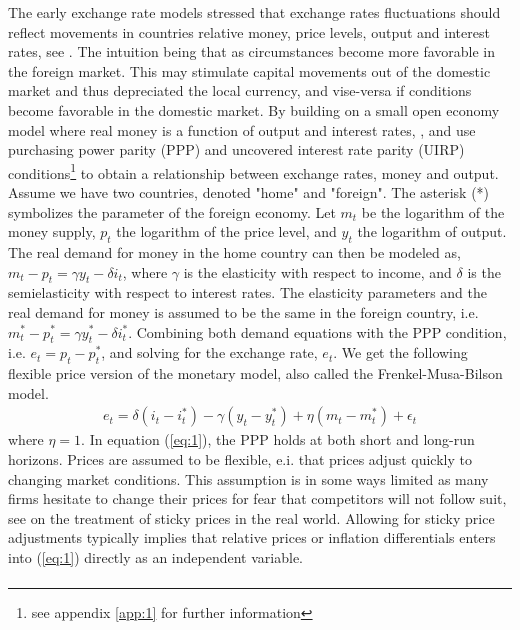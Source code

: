 \documentclass[10pt]{article}
\numberwithin{equation}{section}
\numberwithin{table}{section}
\numberwithin{figure}{section}
\begin{document}
\begin{spacing}{1.5}
\noindent The early exchange rate models stressed that exchange rates fluctuations should reflect movements in countries relative money, price levels, output and interest rates, see \cite{hicks1967monetary}. The intuition being that as circumstances become more favorable in the foreign market. This may stimulate capital movements out of the domestic market and thus depreciated the local currency, and vise-versa if conditions become favorable in the domestic market. By building on a small open economy model where real money is a function of output and interest rates, \cite{frenkel1976monetary}, \cite{mussa1976exchange} and \cite{bilson1978monetary} use purchasing power parity (PPP) and uncovered interest rate parity (UIRP) conditions\footnote{see appendix \ref{app:1} for further information} to obtain a relationship between exchange rates, money and output. Assume we have two countries, denoted "home" and "foreign". The asterisk (*) symbolizes the parameter of the foreign economy. Let $m_t$ be the logarithm of the money supply, $p_t$ the logarithm of the price level, and $y_t$ the logarithm of output. The real demand for money in the home country can then be modeled as, $m_t - p_t = \gamma y_t - \delta i_t$, where $\gamma$ is the elasticity with respect to income, and $\delta$ is the semielasticity with respect to interest rates. The elasticity parameters and the real demand for money is assumed to be the same in the  foreign country, i.e. $m_t^* - p_t^* = \gamma y_t^* - \delta i_t^*$. Combining both demand equations with the PPP condition, i.e. $e_t = p_t - p_t^*$, and solving for the exchange rate, $e_t$. We get the following flexible price version of the monetary model, also called the Frenkel-Musa-Bilson model. 
\begin{align}
    e_t = \delta \left(i_t - i_t^* \right) - \gamma \left(y_t - y_t^* \right) + \eta \left(m_t - m_t^*\right) + \epsilon_t
    \label{eq:1}
\end{align} 
\noindent where $\eta = 1$. In equation (\ref{eq:1}), the PPP holds at both short and long-run horizons. Prices are assumed to be flexible, e.i. that prices adjust quickly to changing market conditions. This assumption is in some ways limited as many firms hesitate to change their prices for fear that competitors will not follow suit, see \cite{blinder1994sticky} on the treatment of sticky prices in the real world. Allowing for sticky price adjustments typically implies that relative prices or inflation differentials enters into (\ref{eq:1}) directly as an independent variable. 
\begin{align}

\end{align}
\end{spacing}
\end{document}
